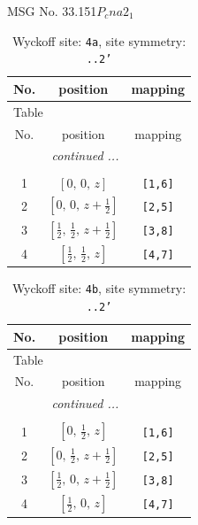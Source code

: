 \documentclass[fleqn,8pt]{jsarticle}
\begin{document}
\setcounter{MaxMatrixCols}{32}

\renewcommand{\tablename}{Table~}
\renewcommand{\figurename}{Figure~}
\begin{center}
\LARGE
MSG No. 33.151\quad$P_{c}na2_{1}$
\end{center}
\renewcommand{\arraystretch}{1.2}
\begin{longtable}{ccc}
\caption{Wyckoff site: {\tt 4a}, site symmetry: {\tt ..2'}}
 \\
 \hline \hline
No. & position & mapping \\ \hline \endfirsthead

\multicolumn{2}{l}{\tablename\ \thetable{}} \\
 \hline \hline
No. & position & mapping \\ \hline \endhead

 \hline \hline
\multicolumn{2}{r}{\footnotesize\it continued ...} \\ \endfoot

 \hline \hline
\multicolumn{2}{r}{} \\ \endlastfoot

1 & $\left[ 0,\, 0,\, z \right]$ & {\tt [1,6]} \\ \hline
2 & $\left[ 0,\, 0,\, z + \frac{1}{2} \right]$ & {\tt [2,5]} \\ \hline
3 & $\left[ \frac{1}{2},\, \frac{1}{2},\, z + \frac{1}{2} \right]$ & {\tt [3,8]} \\ \hline
4 & $\left[ \frac{1}{2},\, \frac{1}{2},\, z \right]$ & {\tt [4,7]} \\
\end{longtable}
\renewcommand{\arraystretch}{1.2}
\begin{longtable}{ccc}
\caption{Wyckoff site: {\tt 4b}, site symmetry: {\tt ..2'}}
 \\
 \hline \hline
No. & position & mapping \\ \hline \endfirsthead

\multicolumn{2}{l}{\tablename\ \thetable{}} \\
 \hline \hline
No. & position & mapping \\ \hline \endhead

 \hline \hline
\multicolumn{2}{r}{\footnotesize\it continued ...} \\ \endfoot

 \hline \hline
\multicolumn{2}{r}{} \\ \endlastfoot

1 & $\left[ 0,\, \frac{1}{2},\, z \right]$ & {\tt [1,6]} \\ \hline
2 & $\left[ 0,\, \frac{1}{2},\, z + \frac{1}{2} \right]$ & {\tt [2,5]} \\ \hline
3 & $\left[ \frac{1}{2},\, 0,\, z + \frac{1}{2} \right]$ & {\tt [3,8]} \\ \hline
4 & $\left[ \frac{1}{2},\, 0,\, z \right]$ & {\tt [4,7]} \\
\end{longtable}
\end{document}
